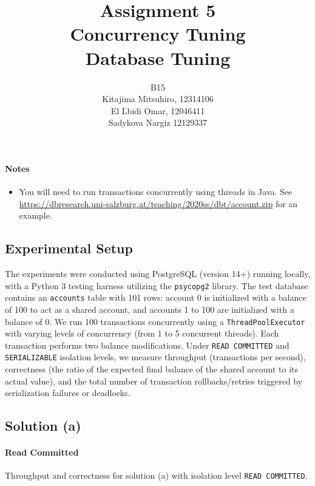 \documentclass[11pt]{scrartcl}
\title{
  \textbf{\large Assignment 5} \\
  Concurrency Tuning \\
  {\large Database Tuning}}
\author{
  B15 \\
  \large Kitajima Mitsuhiro, 12314106 \\
  \large El Lbidi Omar, 12046411 \\
  \large Sadykova Nargiz 12129337
}
\begin{document}
\maketitle

\paragraph{Notes}

\begin{itemize}
  \item You will need to run transactions concurrently using threads in Java. See \\ \url{https://dbresearch.uni-salzburg.at/teaching/2020ss/dbt/account.zip} for an example.
\end{itemize}

\subsection*{Experimental Setup}

The experiments were conducted using PostgreSQL (version 14+) running locally, with a Python 3 testing harness utilizing the \lstinline{psycopg2} library. 
The test database contains an \lstinline{accounts} table with 101 rows: account 0 is initialized with a balance of 100 to act as a shared account, and accounts 1 to 100 are initialized with a balance of 0. 
We run 100 transactions concurrently using a \lstinline{ThreadPoolExecutor} with varying levels of concurrency (from 1 to 5 concurrent threads). 
Each transaction performs two balance modifications. Under \lstinline{READ COMMITTED} and \lstinline{SERIALIZABLE} isolation levels, we measure throughput (transactions per second), correctness (the ratio of the expected final balance of the shared account to its actual value), and the total number of transaction rollbacks/retries triggered by serialization failures or deadlocks.

\subsection*{Solution (a)}

\paragraph{Read Committed}

Throughput and correctness for solution (a) with isolation level \lstinline[style=dbtsql]{READ COMMITTED}.
\end{document}
